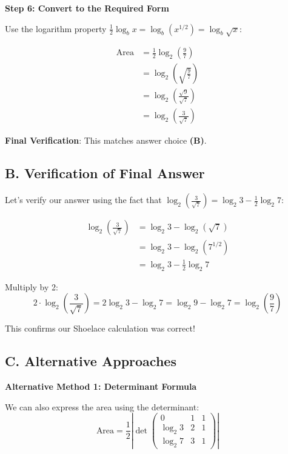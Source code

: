 \documentclass[12pt]{article}
\begin{document}
\begin{solutionbox}
\vspace{0.3cm}

\textbf{Step 6: Convert to the Required Form}

Use the logarithm property $\frac{1}{2}\log_b x = \log_b(x^{1/2}) = \log_b\sqrt{x}$:

\begin{align*}
    \text{Area} &= \frac{1}{2}\log_2\left(\frac{9}{7}\right) \\
    &= \log_2\left(\sqrt{\frac{9}{7}}\right) \\
    &= \log_2\left(\frac{\sqrt{9}}{\sqrt{7}}\right) \\
    &= \log_2\left(\frac{3}{\sqrt{7}}\right)
\end{align*}

\textbf{Final Verification}: This matches answer choice \textbf{(B)}.

\subsection*{B. Verification of Final Answer}

Let's verify our answer using the fact that $\log_2\left(\frac{3}{\sqrt{7}}\right) = \log_2 3 - \frac{1}{2}\log_2 7$:

\begin{align*}
    \log_2\left(\frac{3}{\sqrt{7}}\right) &= \log_2 3 - \log_2(\sqrt{7}) \\
    &= \log_2 3 - \log_2(7^{1/2}) \\
    &= \log_2 3 - \frac{1}{2}\log_2 7
\end{align*}

Multiply by 2:
$$2 \cdot \log_2\left(\frac{3}{\sqrt{7}}\right) = 2\log_2 3 - \log_2 7 = \log_2 9 - \log_2 7 = \log_2\left(\frac{9}{7}\right)$$

This confirms our Shoelace calculation was correct!

\subsection*{C. Alternative Approaches}

\textbf{Alternative Method 1: Determinant Formula}

We can also express the area using the determinant:
$$\text{Area} = \frac{1}{2}\left|\det\begin{pmatrix} 
0 & 1 & 1 \\ 
\log_2 3 & 2 & 1 \\ 
\log_2 7 & 3 & 1 
\end{pmatrix}\right|$$


\end{solutionbox}
\end{document}
